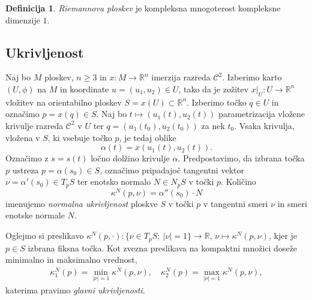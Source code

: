 \documentclass[12pt,a4paper,twoside]{article}
\theoremstyle{definition} %
\newtheorem{definicija}{Definicija}[section]
\theoremstyle{plain} %
\numberwithin{equation}{section}  %
\newcommand{\R}{\mathbb R}
\begin{document}
\begin{definicija}
\emph{Riemannova ploskev} je kompleksna mnogoterost kompleksne dimenzije $1$.
\end{definicija}

\subsection{Ukrivljenost}
%
Naj bo $M$ ploskev, $n \geq 3$ in $x \colon M \to \R^{n}$ imerzija razreda $\mathcal{C}^2$. Izberimo karto $(U, \phi)$ na $M$ in koordinate $u = (u_1, u_2) \in U$, tako da je zožitev $x|_{U} \colon U \to \R^{n}$ vložitev na orientabilno ploskev $S = x(U) \subset \R^{n}$. Izberimo točko $q \in U$ in označimo $p = x(q) \in S$. Naj bo $t \mapsto (u_1(t), u_2(t))$ parametrizacija vložene krivulje razreda $\mathcal{C}^2$ v $U$ ter $q = (u_1(t_0), u_2(t_0))$ za nek $t_0$. Vsaka krivulja, vložena v $S$, ki vsebuje točko $p$, je tedaj oblike
\begin{equation}
\alpha (t) = x(u_1(t), u_2(t)).
\end{equation}
Označimo z $s = s(t)$ ločno dolžino krivulje $\alpha$. Predpostavimo, da izbrana točka $p$ ustreza $p = \alpha(s_0) \in S$, označimo pripadajoč tangentni vektor $\nu = \alpha '(s_0) \in T_{p}S$ ter enotsko normalo $N \in N_{p}S$ v točki $p$. Količino
\begin{equation}
\kappa ^{N}(p, \nu) = \alpha ''(s_0) \cdot N
\end{equation}
imenujemo \emph{normalna ukrivljenost} ploskve $S$ v točki $p$ v tangentni smeri $\nu$ in smeri enotske normale $N$.

Oglejmo si preslikavo $ \kappa ^{N}(p, \cdot) \colon \{\nu \in T_{p}S ; \ |\nu|=1 \} \to \R$, $ \nu \mapsto \kappa ^{N}(p, \nu)$, kjer je $p \in S$ izbrana fiksna točka. Kot zvezna preslikava na kompaktni množici doseže minimalno in maksimalno vrednost,
\begin{align}
\kappa _{1}^{N}(p) = \min _{|\nu| = 1} \kappa ^{N}(p, \nu), \quad \kappa _{2}^{N}(p) = \max _{|\nu| = 1} \kappa ^{N}(p, \nu),
\end{align}
katerima pravimo \emph{glavni ukrivljenosti}.
\end{document}
